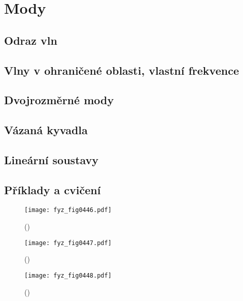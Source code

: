 \setchaptertoc
\chapter{Mody}\label{fyz:IchapIL}

  \section{Odraz vln}\label{fyz:IchapILsecI}
  \section{Vlny v ohraničené oblasti, vlastní frekvence}\label{fyz:IchapILsecII}
  \section{Dvojrozměrné mody}\label{fyz:IchapILsecIII}
  \section{Vázaná kyvadla}\label{fyz:IchapILsecIV}
  \section{Lineární soustavy}\label{fyz:IchapILsecV}
  \section{Příklady a cvičení}\label{fyz:IchapILsecVI}

    \begin{figure}[ht!] %
      \centering
      \texttt{[image: fyz\_fig0446.pdf]}
      \caption{ 
               (\cite[s.~707]{Feynman01})}
      \label{fyz:fig0446}
    \end{figure}

    \begin{figure}[ht!] %
      \centering
      \texttt{[image: fyz\_fig0447.pdf]}
      \caption{ 
               (\cite[s.~707]{Feynman01})}
      \label{fyz:fig0447}
    \end{figure}

    \begin{figure}[ht!] %
      \centering
      \texttt{[image: fyz\_fig0448.pdf]}
      \caption{ 
               (\cite[s.~707]{Feynman01})}
      \label{fyz:fig0448}
    \end{figure}

